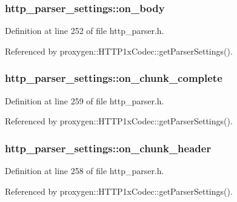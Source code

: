 \subsubsection[{on\+\_\+body}]{ http\+\_\+parser\+\_\+settings\+::on\+\_\+body}\label{structhttp__parser__settings_aaa145d7c24c91f471b2079ecb6368ae4}


Definition at line 252 of file http\+\_\+parser.\+h.



Referenced by proxygen\+::\+H\+T\+T\+P1x\+Codec\+::get\+Parser\+Settings().

\subsubsection[{on\+\_\+chunk\+\_\+complete}]{ http\+\_\+parser\+\_\+settings\+::on\+\_\+chunk\+\_\+complete}\label{structhttp__parser__settings_ac1c8453573094795ef41d4ba26e78846}


Definition at line 259 of file http\+\_\+parser.\+h.



Referenced by proxygen\+::\+H\+T\+T\+P1x\+Codec\+::get\+Parser\+Settings().

\subsubsection[{on\+\_\+chunk\+\_\+header}]{ http\+\_\+parser\+\_\+settings\+::on\+\_\+chunk\+\_\+header}\label{structhttp__parser__settings_a497cf8f9d68e06e54684b71ee0f9f828}


Definition at line 258 of file http\+\_\+parser.\+h.



Referenced by proxygen\+::\+H\+T\+T\+P1x\+Codec\+::get\+Parser\+Settings().


